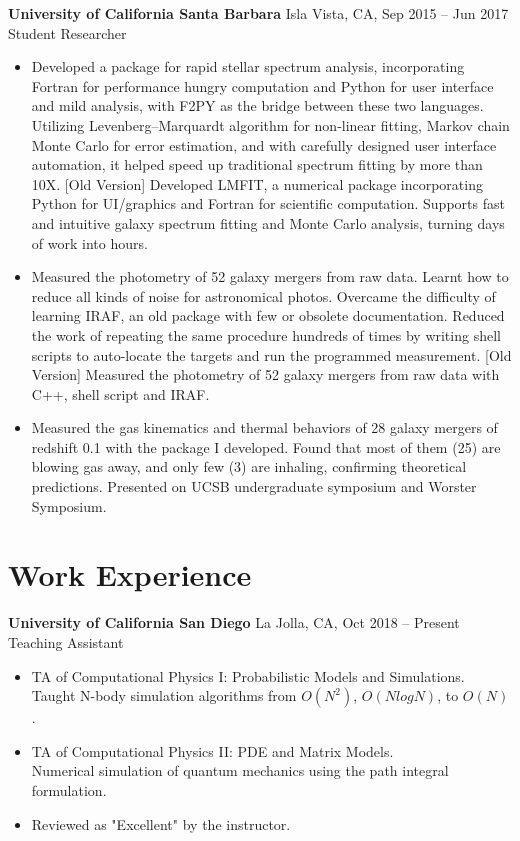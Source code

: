 \documentclass[letterpaper,12pt]{article}
\newenvironment{zitemize}{
\begin{itemize} \vspace{-.9em}\itemsep 0pt \parskip 0pt}
{\end{itemize}\vspace{-.5em}}
\newcommand{\previousversion}[1]{{\color{gray} [Old Version] #1}}
\begin{document}
\textbf{University of California Santa Barbara} \hfill Isla Vista, CA, Sep 2015 -- Jun 2017 \\
Student Researcher \\
\begin{zitemize}
\item Developed a package for rapid stellar spectrum analysis, incorporating Fortran for performance hungry computation and Python for user interface and mild analysis, with F2PY as the bridge between these two languages. Utilizing Levenberg–Marquardt algorithm for non-linear fitting, Markov chain Monte Carlo for error estimation, and with carefully designed user interface automation, it helped speed up traditional spectrum fitting by more than 10X. \previousversion{Developed LMFIT, a numerical package incorporating Python for UI/graphics and Fortran for scientific computation. Supports fast and intuitive galaxy spectrum fitting and Monte Carlo analysis, turning days of work into hours.}
\item Measured the photometry of 52 galaxy mergers from raw data. Learnt how to reduce all kinds of noise for astronomical photos. Overcame the difficulty of learning IRAF, an old package with few or obsolete documentation. Reduced the work of repeating the same procedure hundreds of times by writing shell scripts to auto-locate the targets and run the programmed measurement. \previousversion{Measured the photometry of 52 galaxy mergers from raw data with C++, shell script and IRAF.}
\item Measured the gas kinematics and thermal behaviors of 28 galaxy mergers of redshift 0.1 with the package I developed. Found that most of them (25) are blowing gas away, and only few (3) are inhaling, confirming theoretical predictions. Presented on UCSB undergraduate symposium and Worster Symposium.
\end{zitemize}



\section{Work Experience}

\textbf{University of California San Diego} \hfill La Jolla, CA, Oct 2018 -- Present \\
Teaching Assistant
\begin{zitemize}
\item TA of Computational Physics I: Probabilistic Models and Simulations. \\
Taught N-body simulation algorithms from $O(N^2)$, $O(NlogN)$, to $O(N)$.
\item TA of Computational Physics II: PDE and Matrix Models. \\
Numerical simulation of quantum mechanics using the path integral formulation.
\item Reviewed as "Excellent" by the instructor.
\end{zitemize}
\end{document}
